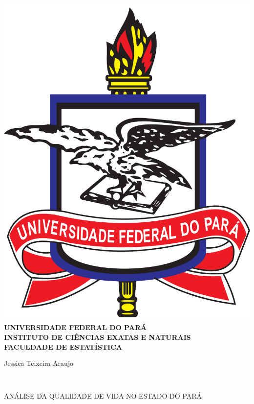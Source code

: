 \documentclass[a4paper, 10pt]{article}
\begin{document}
	\begin{center}
		
			\textbf{ \includegraphics[scale=0.06]{figs/ufpa.png}  \\UNIVERSIDADE  FEDERAL DO PARÁ \\ INSTITUTO DE CIÊNCIAS EXATAS E NATURAIS \\ FACULDADE DE ESTATÍSTICA}  
			
			\vspace{4cm}
	\end{center}
	
	\begin{center}
	    Jessica Teixeira Araujo
	\end{center}
    \\
    		\vspace{4cm}
        	\begin{center}	
        ANÁLISE DA QUALIDADE DE VIDA NO ESTADO DO PARÁ
		\end{center}
			
\end{document}
